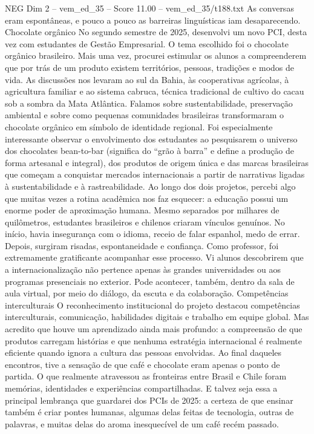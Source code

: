 \begin{textsample}{NEG Dim 2 – vem\_ed\_35 – Score 11.00 – vem\_ed\_35/t188.txt}
As conversas eram espontâneas, e pouco a pouco as barreiras linguísticas iam desaparecendo.
Chocolate orgânico No segundo semestre de 2025, desenvolvi um novo PCI, desta vez com estudantes de Gestão Empresarial.
O tema escolhido foi o chocolate orgânico brasileiro.
Mais uma vez, procurei estimular os alunos a compreenderem que por trás de um produto existem territórios, pessoas, tradições e modos de vida.
As discussões nos levaram ao sul da Bahia, às cooperativas agrícolas, à agricultura familiar e ao sistema cabruca, técnica tradicional de cultivo do cacau sob a sombra da Mata Atlântica.
Falamos sobre sustentabilidade, preservação ambiental e sobre como pequenas comunidades brasileiras transformaram o chocolate orgânico em símbolo de identidade regional.
Foi especialmente interessante observar o envolvimento dos estudantes ao pesquisarem o universo dos chocolates bean-to-bar (significa do “grão à barra” e define a produção de forma artesanal e integral), dos produtos de origem única e das marcas brasileiras que começam a conquistar mercados internacionais a partir de narrativas ligadas à sustentabilidade e à rastreabilidade.
Ao longo dos dois projetos, percebi algo que muitas vezes a rotina acadêmica nos faz esquecer: a educação possui um enorme poder de aproximação humana.
Mesmo separados por milhares de quilômetros, estudantes brasileiros e chilenos criaram vínculos genuínos.
No início, havia insegurança com o idioma, receio de falar espanhol, medo de errar.
Depois, surgiram risadas, espontaneidade e confiança.
Como professor, foi extremamente gratificante acompanhar esse processo.
Vi alunos descobrirem que a internacionalização não pertence apenas às grandes universidades ou aos programas presenciais no exterior.
Pode acontecer, também, dentro da sala de aula virtual, por meio do diálogo, da escuta e da colaboração.
Competências interculturais O reconhecimento institucional do projeto destacou competências interculturais, comunicação, habilidades digitais e trabalho em equipe global.
Mas acredito que houve um aprendizado ainda mais profundo: a compreensão de que produtos carregam histórias e que nenhuma estratégia internacional é realmente eficiente quando ignora a cultura das pessoas envolvidas.
Ao final daqueles encontros, tive a sensação de que café e chocolate eram apenas o ponto de partida.
O que realmente atravessou as fronteiras entre Brasil e Chile foram memórias, identidades e experiências compartilhadas.
E talvez seja essa a principal lembrança que guardarei dos PCIs de 2025: a certeza de que ensinar também é criar pontes humanas, algumas delas feitas de tecnologia, outras de palavras, e muitas delas do aroma inesquecível de um café recém passado.

\end{textsample}
